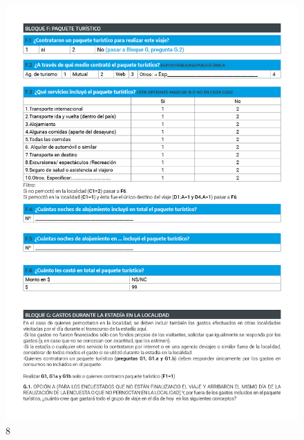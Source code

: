 \documentclass[
]{book}
\begin{document}
\begin{figure}

{\centering \includegraphics[width=1\linewidth]{imagenes/graf08} 

}

\caption{8}\label{fig:008}
\end{figure}
\end{document}
